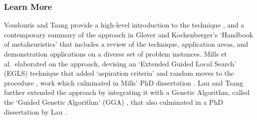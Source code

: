 % 
% 
\subsubsection{Learn More}
Voudouris and Tsang provide a high-level introduction to the technique \cite{Voudouris1998}, and a contemporary summary of the approach in Glover and Kochenberger's `Handbook of metaheuristics' \cite{Glover2003a} that includes a review of the technique, application areas, and demonstration applications on a diverse set of problem instances.
Mills et al.\ elaborated on the approach, devising an `Extended Guided Local Search' (EGLS) technique that added `aspiration criteria' and random moves to the procedure \cite{Mills2003}, work which culminated in Mills' PhD dissertation \cite{Mills2002}.  
Lau and Tsang further extended the approach by integrating it with a Genetic Algorithm, called the `Guided Genetic Algorithm' (GGA) \cite{Lau1998}, that also culminated in a PhD dissertation by Lau \cite{Lau1999}.


